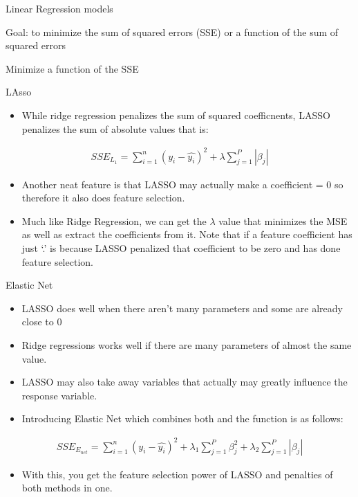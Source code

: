 \documentclass[ignorenonframetext,]{beamer}
\providecommand{\tightlist}{%
  \setlength{\itemsep}{0pt}\setlength{\parskip}{0pt}}
\begin{document}
\begin{frame}{Linear Regression models}
\begin{block}{Goal: to minimize the sum of squared errors (SSE) or a
function of the sum of squared errors}
\begin{block}{Minimize a function of the SSE}
\begin{block}{LAsso}

\begin{itemize}
\tightlist
\item
  While ridge regression penalizes the sum of squared coefficnents,
  LASSO penalizes the sum of absolute values that is:
\end{itemize}

\[
\begin{aligned}
SSE_{L_1} = \sum_{i=1}^n (y_i - \hat{y_i})^2 + \lambda \sum_{j=1}^P |{\beta_j}|
\end{aligned}
\]

\begin{itemize}
\item
  Another neat feature is that LASSO may actually make a coefficient = 0
  so therefore it also does feature selection.
\item
  Much like Ridge Regression, we can get the \(\lambda\) value that
  minimizes the MSE as well as extract the coefficients from it. Note
  that if a feature coefficient has just `.' is because LASSO penalized
  that coefficient to be zero and has done feature selection.
\end{itemize}

\end{block}

\begin{block}{Elastic Net}

\begin{itemize}
\item
  LASSO does well when there aren't many parameters and some are already
  close to 0
\item
  Ridge regressions works well if there are many parameters of almost
  the same value.
\item
  LASSO may also take away variables that actually may greatly influence
  the response variable.
\item
  Introducing Elastic Net which combines both and the function is as
  follows:
\end{itemize}

\[
\begin{aligned}
SSE_{E_{net}} = \sum_{i=1}^n (y_i - \hat{y_i})^2 + 
\lambda_1 \sum_{j=1}^P \beta_j^2 + \lambda_2 \sum_{j=1}^P |{\beta_j}|
\end{aligned}
\]

\begin{itemize}
\tightlist
\item
  With this, you get the feature selection power of LASSO and penalties
  of both methods in one.
\end{itemize}

\end{block}

\end{block}

\end{block}

\end{frame}
\end{document}
